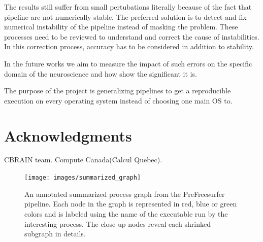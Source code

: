 \documentclass{article}
\begin{document}
{The results still suffer from small pertubations literally because of the fact that pipeline are not numerically stable.
The preferred solution is to detect and fix numerical instability of the pipeline instead of masking the problem.
These processes need to be reviewed to understand and correct the cause of instabilities. 
In this correction process, accuracy has to be considered in addition to stability.

\item In the future works we aim to measure the impact of such errors
on the specific domain of the neuroscience and how show the significant it is.

\item The purpose of the project is generalizing pipelines to get a reproducible execution 
on every operating system instead of choosing one main OS to.


\section{Acknowledgments}

CBRAIN team. Compute Canada(Calcul Quebec).


\begin{figure}[H]
  \texttt{[image: images/summarized\_graph]}
  \caption{An annotated summarized process graph from the PreFreesurfer pipeline.
Each node in the graph is represented in red, blue or green colors and is labeled 
using the name of the executable run by the interesting process. The close up nodes 
reveal each shrinked subgraph in details.}
  \label{fig:summarized-graph}
\end{figure}

}
\end{document}
